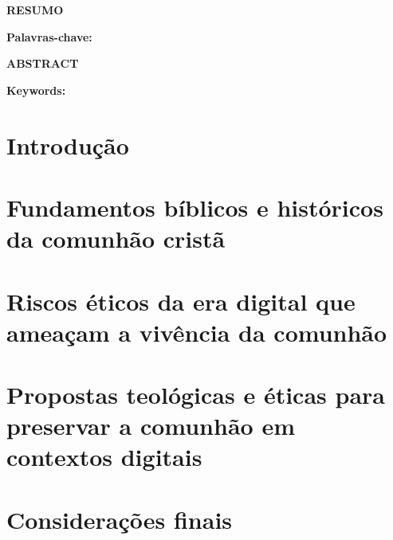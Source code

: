 \documentclass[12pt,a4paper]{article}
\begin{document}




\pagestyle{empty}







\newpage
\begin{center}
    \large \textbf{\MakeUppercase{Resumo}}
\end{center}

\vspace{1cm}

\justifying


\vspace{0.5cm}

\noindent
\textbf{Palavras-chave:} \textit{\palavrasChave}

\newpage
\begin{center}
    \large \textbf{\MakeUppercase{Abstract}}
\end{center}

\vspace{1cm}

\justifying


\vspace{0.5cm}

\noindent
\textbf{Keywords:} \textit{\keywords}

\newpage
\thispagestyle{empty}
\tableofcontents

\newpage
{}
\pagestyle{plain}

\section{Introdução}

\newpage
\section{Fundamentos bíblicos e históricos da comunhão cristã}

\newpage
\section{Riscos éticos da era digital que ameaçam a vivência da comunhão}

\newpage
\section{Propostas teológicas e éticas para preservar a comunhão em contextos digitais}

\newpage
\section{Considerações finais}

\newpage

\end{document}
